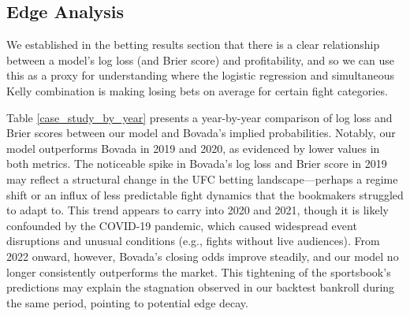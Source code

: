 \documentclass[12pt,twoside]{report}
\begin{document}
\subsection{Edge Analysis}

We established in the betting results section that there is a clear relationship between a model's log loss (and Brier score) and profitability, and so we can use this as a proxy for understanding where the logistic regression and simultaneous Kelly combination is making losing bets on average for certain fight categories.

Table \ref{case_study_by_year} presents a year-by-year comparison of log loss and Brier scores between our model and Bovada's implied probabilities. Notably, our model outperforms Bovada in 2019 and 2020, as evidenced by lower values in both metrics. The noticeable spike in Bovada’s log loss and Brier score in 2019 may reflect a structural change in the UFC betting landscape---perhaps a regime shift or an influx of less predictable fight dynamics that the bookmakers struggled to adapt to. This trend appears to carry into 2020 and 2021, though it is likely confounded by the COVID-19 pandemic, which caused widespread event disruptions and unusual conditions (e.g., fights without live audiences). From 2022 onward, however, Bovada’s closing odds improve steadily, and our model no longer consistently outperforms the market. This tightening of the sportsbook’s predictions may explain the stagnation observed in our backtest bankroll during the same period, pointing to potential edge decay.
 
\end{document}
